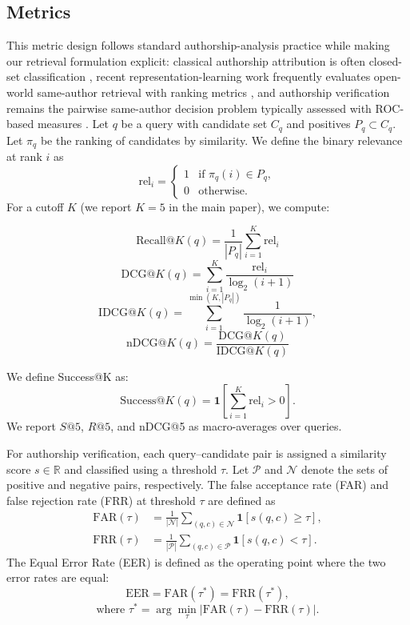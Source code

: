 \documentclass{article}
\newcommand{\rev}[1]{#1}
\newcommand{\ind}[1]{\mathbf{1}\!\left[#1\right]}
\begin{document}
\subsection{Metrics}
\label{subsec:metrics}
\rev{This metric design follows standard authorship-analysis practice while making our retrieval formulation explicit: classical authorship attribution is often closed-set classification \citep{stamatatos2009survey,neal2017surveying}, recent representation-learning work frequently evaluates open-world same-author retrieval with ranking metrics \citep{riverasoto2021luar,wang2023canrep}, and authorship verification remains the pairwise same-author decision problem typically assessed with ROC-based measures \citep{pan2022av,pan2023av}.}
Let $q$ be a query with candidate set $C_q$ and positives $P_q \subset C_q$.
Let $\pi_q$ be the ranking of candidates by similarity. We define the binary
relevance at rank $i$ as
\[
\mathrm{rel}_i =
\begin{cases}
1 & \text{if } \pi_q(i) \in P_q, \\
0 & \text{otherwise}.
\end{cases}
\]
For a cutoff $K$ \rev{(we report $K=5$ in the main paper)}, we compute:

\[
\mathrm{Recall@}K(q) = \frac{1}{|P_q|} \sum_{i=1}^{K} \mathrm{rel}_i
\]
\[
\mathrm{DCG@}K(q) = \sum_{i=1}^{K} \frac{\mathrm{rel}_i}{\log_2(i+1)}
\]
\[
\mathrm{IDCG@}K(q) = \sum_{i=1}^{\min(K,|P_q|)} \frac{1}{\log_2(i+1)},
\]
\[
\mathrm{nDCG@}K(q) = \frac{\mathrm{DCG@}K(q)}{\mathrm{IDCG@}K(q)}
\]

We define Success@K as:
\[
\mathrm{Success@}K(q) = \ind{\sum_{i=1}^{K} \mathrm{rel}_i > 0}.
\]
We report $S@5$, $R@5$, and nDCG@5 as macro-averages over queries.

For authorship verification, each query--candidate pair is assigned a similarity
score $s \in \mathbb{R}$ and classified using a threshold $\tau$.
Let $\mathcal{P}$ and $\mathcal{N}$ denote the sets of positive and negative pairs,
respectively. The false acceptance rate (FAR) and false rejection rate (FRR) at
threshold $\tau$ are defined as
\begin{align}
\mathrm{FAR}(\tau) &= \frac{1}{|\mathcal{N}|} \sum_{(q,c)\in\mathcal{N}} \ind{s(q,c) \ge \tau}, \\
\mathrm{FRR}(\tau) &= \frac{1}{|\mathcal{P}|} \sum_{(q,c)\in\mathcal{P}} \ind{s(q,c) < \tau}.
\end{align}
The Equal Error Rate (EER) is defined as the operating point where the two error
rates are equal:
\[
\mathrm{EER} = \mathrm{FAR}(\tau^\ast) = \mathrm{FRR}(\tau^\ast),
\]
\[
\text{where } \tau^\ast = \arg\min_{\tau} \left| \mathrm{FAR}(\tau) - \mathrm{FRR}(\tau) \right|.
\]
\end{document}
